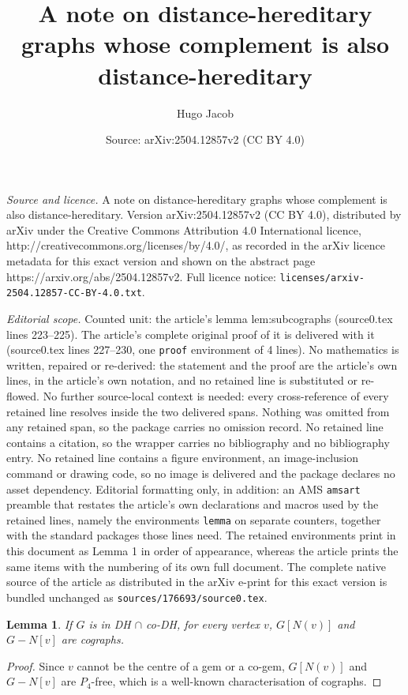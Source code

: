 \documentclass[10pt,a4paper]{amsart}
\title{A note on distance-hereditary graphs whose complement is also distance-hereditary}
\author{Hugo Jacob}
\date{Source: arXiv:2504.12857v2 (CC BY 4.0)}
\newtheorem{lemma}{Lemma}
\def\DHcoDH{DH $\cap$ co-DH}
\begin{document}
\maketitle

\noindent\emph{Source and licence.} A note on distance-hereditary graphs whose complement is also distance-hereditary. Version arXiv:2504.12857v2 (CC BY 4.0), distributed by arXiv under the Creative Commons Attribution 4.0 International licence, http://creativecommons.org/licenses/by/4.0/, as recorded in the arXiv licence metadata for this exact version and shown on the abstract page https://arxiv.org/abs/2504.12857v2. Full licence notice: \texttt{licenses/arxiv-2504.12857-CC-BY-4.0.txt}.\par\smallskip

\noindent\textit{Editorial scope.} Counted unit: the article's lemma lem:subcographs (source0.tex lines 223--225). The article's complete original proof of it is delivered with it (source0.tex lines 227--230, one \texttt{proof} environment of 4 lines). No mathematics is written, repaired or re-derived: the statement and the proof are the article's own lines, in the article's own notation, and no retained line is substituted or re-flowed.  No further source-local context is needed: every cross-reference of every retained line resolves inside the two delivered spans.  Nothing was omitted from any retained span, so the package carries no omission record.  No retained line contains a citation, so the wrapper carries no bibliography and no bibliography entry.  No retained line contains a figure environment, an image-inclusion command or drawing code, so no image is delivered and the package declares no asset dependency.  Editorial formatting only, in addition: an AMS \texttt{amsart} preamble that restates the article's own declarations and macros used by the retained lines, namely the environments \texttt{lemma} on separate counters, together with the standard packages those lines need.  The retained environments print in this document as Lemma 1 in order of appearance, whereas the article prints the same items with the numbering of its own full document.  The complete native source of the article as distributed in the arXiv e-print for this exact version is bundled unchanged as \texttt{sources/176693/source0.tex}.
\begin{lemma}\label{lem:subcographs}
If $G$ is in \DHcoDH{}, for every vertex $v$, $G[N(v)]$ and $G-N[v]$ are cographs.
\end{lemma}

\begin{proof}
Since $v$ cannot be the centre of a gem or a co-gem, $G[N(v)]$ and $G-N[v]$ are
$P_4$-free, which is a well-known characterisation of cographs.
\end{proof}
\end{document}
